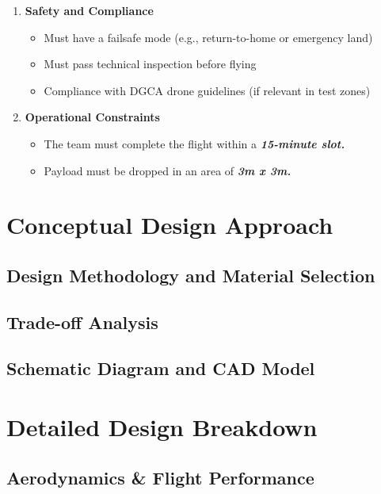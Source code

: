 \documentclass[12pt]{report}
\begin{document}
\begin{enumerate}
\begin{itemize}
        \end{itemize}
      \item \textbf{Safety and Compliance}
        \begin{itemize}
          \item Must have a failsafe mode (e.g., return-to-home or emergency land)
          \item Must pass technical inspection before flying
          \item Compliance with DGCA drone guidelines (if relevant in test zones)
        \end{itemize}
      \item \textbf{Operational Constraints}
        \begin{itemize}
          \item The team must complete the flight within a \textbf{\textit{15-minute slot.}}
          \item Payload must be dropped in an area of \textbf{\textit{3m x 3m.}}
        \end{itemize}
    \end{enumerate}
  \chapter{Conceptual Design Approach}
    \section{Design Methodology and Material Selection}

    \section{Trade-off Analysis} %
    \section{Schematic Diagram and CAD Model}
                                                 
  \chapter{Detailed Design Breakdown}                                 
    \section{Aerodynamics \& Flight Performance}
\end{document}
